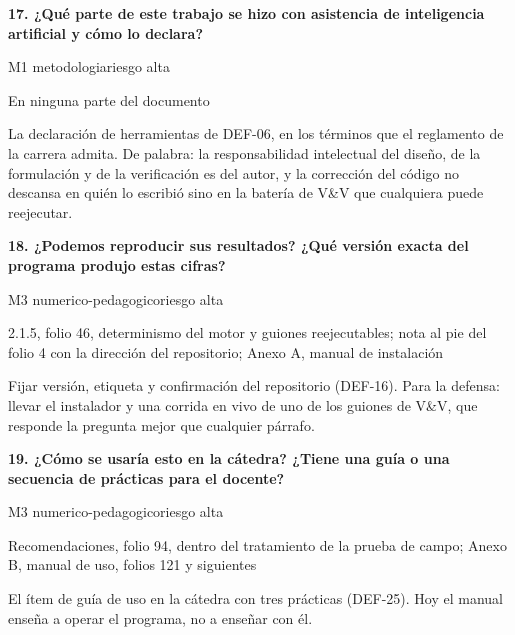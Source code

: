 \vspace{5pt}
\noindent\casilla\textbf{17. ¿Qué parte de este trabajo se hizo con asistencia de inteligencia artificial y cómo lo declara?}\par
{\small\color{gris}\sffamily M1 metodologia\quad{}\quad riesgo alta}\par
{\small{}En ninguna parte del documento\par}
{\small{}La declaración de herramientas de DEF-06, en los términos que el reglamento de la carrera admita. De palabra: la responsabilidad intelectual del diseño, de la formulación y de la verificación es del autor, y la corrección del código no descansa en quién lo escribió sino en la batería de V\&V que cualquiera puede reejecutar.\par}
\vspace{5pt}
\noindent\casilla\textbf{18. ¿Podemos reproducir sus resultados? ¿Qué versión exacta del programa produjo estas cifras?}\par
{\small\color{gris}\sffamily M3 numerico-pedagogico\quad{}\quad riesgo alta}\par
{\small{}2.1.5, folio 46, determinismo del motor y guiones reejecutables; nota al pie del folio 4 con la dirección del repositorio; Anexo A, manual de instalación\par}
{\small{}Fijar versión, etiqueta y confirmación del repositorio (DEF-16). Para la defensa: llevar el instalador y una corrida en vivo de uno de los guiones de V\&V, que responde la pregunta mejor que cualquier párrafo.\par}
\vspace{5pt}
\noindent\casilla\textbf{19. ¿Cómo se usaría esto en la cátedra? ¿Tiene una guía o una secuencia de prácticas para el docente?}\par
{\small\color{gris}\sffamily M3 numerico-pedagogico\quad{}\quad riesgo alta}\par
{\small{}Recomendaciones, folio 94, dentro del tratamiento de la prueba de campo; Anexo B, manual de uso, folios 121 y siguientes\par}
{\small{}El ítem de guía de uso en la cátedra con tres prácticas (DEF-25). Hoy el manual enseña a operar el programa, no a enseñar con él.\par}
\vspace{5pt}
